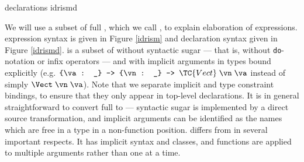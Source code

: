 {\IdrisM{} declarations}
{idrismd}

We will use a subset of full \Idris{}, which we call \IdrisM{}, to explain
elaboration of expressions. \IdrisM{} expression syntax is given in Figure
\ref{idrism} and declaration syntax given in Figure \ref{idrismd}.
\IdrisM{} is a subset of \Idris{} without syntactic sugar --- that is, without
\texttt{do}-notation or infix operators --- and with implicit
arguments in types bound explicitly 
(e.g. $\piimp{\va}{\_}\piimp{\vn}{\_}\TC{Vect}\;\vn\;\va$
instead of simply $\Vect\;\vn\;\va$).
Note that we separate implicit and type constraint bindings, to ensure that they
only appear in top-level declarations.
It is in general straightforward to
convert full \Idris{} to \IdrisM{} --- syntactic sugar is implemented by a
direct source transformation, and implicit arguments can be identified as the names
which are free in a type in a non-function position.
%
\IdrisM{} differs from \TT{} in several important respects. It has implicit
syntax and classes, and functions are applied to multiple arguments rather
than one at a time. 


